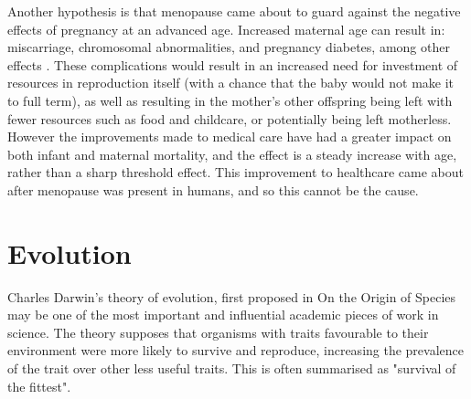\documentclass[authoryearcitations]{UoYCSproject}
\begin{document}
Another hypothesis is that menopause came about to guard against the negative effects of pregnancy at an advanced age. Increased maternal age can result in: miscarriage, chromosomal abnormalities, and pregnancy diabetes, among other effects \cite{cleary2005impact}. These complications would result in an increased need for investment of resources in reproduction itself (with a chance that the baby would not make it to full term), as well as resulting in the mother's other offspring being left with fewer resources such as food and childcare, or potentially being left motherless. However the improvements made to medical care have had a greater impact on both infant and maternal mortality, and the effect is a steady increase with age, rather than a sharp threshold effect. This improvement to healthcare came about after menopause was present in humans, and so this cannot be the cause.

\section{Evolution}
Charles Darwin's theory of evolution, first proposed in On the Origin of Species \cite{origin1859} may be one of the most important and influential academic pieces of work in science. The theory supposes that organisms with traits favourable to their environment were more likely to survive and reproduce, increasing the prevalence of the trait over other less useful traits. This is often summarised as "survival of the fittest".
\end{document}
